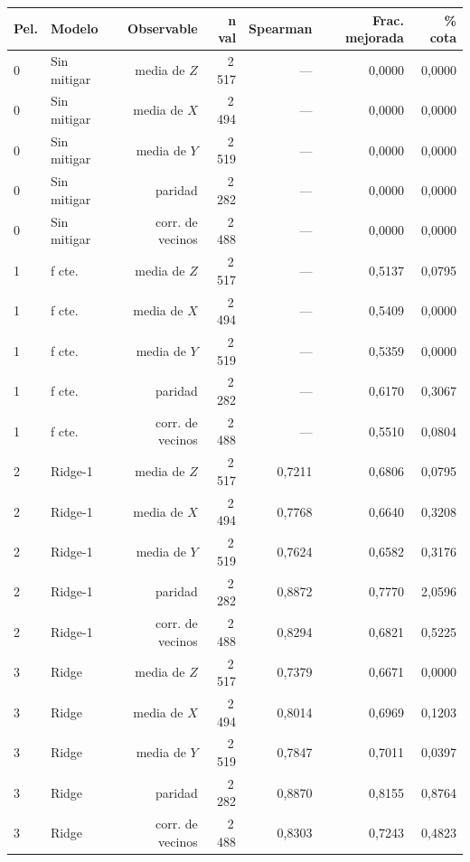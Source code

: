 \begin{table}[htbp]
    \centering
    {\footnotesize
    \begin{tabular}{@{}llrrrrr@{}}
        \toprule
        \textbf{Pel.} & \textbf{Modelo} & \textbf{Observable} & \textbf{n val} & \textbf{Spearman} & \textbf{Frac. mejorada} & \textbf{\% cota} \\
        \midrule
        0 & Sin mitigar & media de $Z$ & 2\,517 & --- & 0,0000 & 0,0000 \\
        0 & Sin mitigar & media de $X$ & 2\,494 & --- & 0,0000 & 0,0000 \\
        0 & Sin mitigar & media de $Y$ & 2\,519 & --- & 0,0000 & 0,0000 \\
        0 & Sin mitigar & paridad & 2\,282 & --- & 0,0000 & 0,0000 \\
        0 & Sin mitigar & corr. de vecinos & 2\,488 & --- & 0,0000 & 0,0000 \\
        1 & f cte. & media de $Z$ & 2\,517 & --- & 0,5137 & 0,0795 \\
        1 & f cte. & media de $X$ & 2\,494 & --- & 0,5409 & 0,0000 \\
        1 & f cte. & media de $Y$ & 2\,519 & --- & 0,5359 & 0,0000 \\
        1 & f cte. & paridad & 2\,282 & --- & 0,6170 & 0,3067 \\
        1 & f cte. & corr. de vecinos & 2\,488 & --- & 0,5510 & 0,0804 \\
        2 & Ridge-1 & media de $Z$ & 2\,517 & 0,7211 & 0,6806 & 0,0795 \\
        2 & Ridge-1 & media de $X$ & 2\,494 & 0,7768 & 0,6640 & 0,3208 \\
        2 & Ridge-1 & media de $Y$ & 2\,519 & 0,7624 & 0,6582 & 0,3176 \\
        2 & Ridge-1 & paridad & 2\,282 & 0,8872 & 0,7770 & 2,0596 \\
        2 & Ridge-1 & corr. de vecinos & 2\,488 & 0,8294 & 0,6821 & 0,5225 \\
        3 & Ridge & media de $Z$ & 2\,517 & 0,7379 & 0,6671 & 0,0000 \\
        3 & Ridge & media de $X$ & 2\,494 & 0,8014 & 0,6969 & 0,1203 \\
        3 & Ridge & media de $Y$ & 2\,519 & 0,7847 & 0,7011 & 0,0397 \\
        3 & Ridge & paridad & 2\,282 & 0,8870 & 0,8155 & 0,8764 \\
        3 & Ridge & corr. de vecinos & 2\,488 & 0,8303 & 0,7243 & 0,4823 \\

\end{tabular}}
\end{table}
